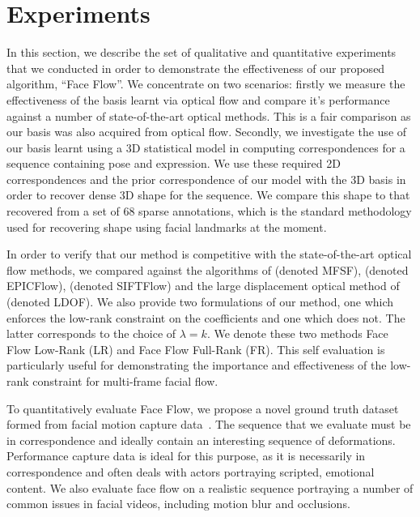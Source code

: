 \section{Experiments}\label{sec:face_flow_experiments}
In this section, we describe the set of qualitative and quantitative experiments
that we conducted in order to demonstrate the effectiveness of our proposed algorithm,
``Face Flow''. We concentrate on two scenarios: firstly we measure the effectiveness
of the basis learnt via optical flow and compare it's performance against
a number of state-of-the-art optical methods. This is a fair comparison as our
basis was also acquired from optical flow. Secondly, we investigate the use
of our basis learnt using a 3D statistical model in computing correspondences
for a sequence containing pose and expression. We use these required 2D correspondences
and the prior correspondence of our model with the 3D basis in order to recover
dense 3D shape for the sequence. We compare this shape to that recovered from
a set of 68 sparse annotations, which is the standard methodology used for recovering
shape using facial landmarks at the moment.

In order to verify that our method is competitive with the state-of-the-art
optical flow methods,
we compared against the algorithms of
\citet{garg2013variational} (denoted MFSF),
\citet{revaud2015epicflow} (denoted EPICFlow),
\citet{liu2011sift} (denoted SIFTFlow) and the large displacement
optical method of \citet{brox2011large} (denoted LDOF). We also provide two
formulations of our method, one which enforces the low-rank constraint on the coefficients
and one which does not. The latter corresponds to the choice of $\lambda=k$.
We denote these two methods Face Flow Low-Rank (LR) and Face Flow
Full-Rank (FR). This self evaluation is particularly useful for demonstrating the importance
and effectiveness of the low-rank constraint for multi-frame facial flow.

To quantitatively evaluate Face Flow, we propose a novel ground truth dataset formed
from facial motion capture data~\cite{zhang2004spacetime}. The sequence that we
evaluate must be in correspondence and ideally contain an interesting
sequence of deformations. Performance capture data is ideal for this purpose, as
it is necessarily in correspondence and often deals with actors portraying
scripted, emotional content. We also evaluate face flow on a realistic sequence
portraying a number of common issues in facial videos, including motion blur
and occlusions.

